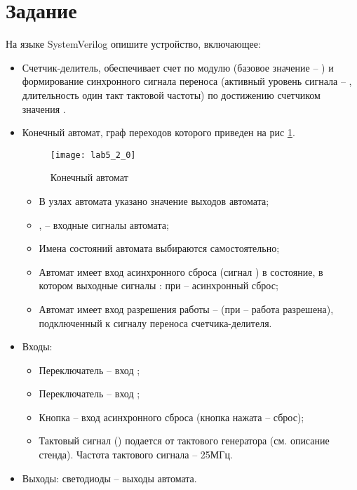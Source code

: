 





\tableofcontents
\listoffigures
\lstlistoflistings
\newpage

\section{Задание}

На языке SystemVerilog опишите устройство, включающее:
\begin{itemize}
	\item Счетчик-делитель, обеспечивает счет по модулю  (базовое значение -- ) и формирование синхронного сигнала переноса (активный уровень сигнала -- , длительность один такт тактовой частоты) по достижению счетчиком значения .
	\item Конечный автомат, граф переходов которого приведен на рис \ref{fig:lab5_2_0}.
		\vspace{-0.5cm}
		\begin{figure}[H]
		\begin{center}
			\texttt{[image: lab5\_2\_0]}
			\caption{Конечный автомат}
			\label{fig:lab5_2_0}
		\end{center}
		\end{figure}
		\vspace{-1cm}
		\begin{itemize}
			\item В узлах автомата указано значение выходов автомата;
			\item {},  – входные сигналы автомата;
			\item Имена состояний автомата выбираются самостоятельно;
			\item Автомат имеет вход асинхронного сброса (сигнал ) в состояние, в котором выходные сигналы : при  – асинхронный сброс;
			\item Автомат имеет вход разрешения работы --  (при  – работа разрешена), подключенный к сигналу переноса счетчика-делителя.
		\end{itemize}	
	\item Входы:
		\begin{itemize}
			\item Переключатель  -- вход ;
			\item Переключатель  – вход ;
			\item Кнопка  – вход асинхронного сброса (кнопка нажата -- сброс);
			\item Тактовый сигнал () подается от тактового генератора (см. описание стенда). Частота тактового сигнала – 25МГц.
		\end{itemize}		
	\item Выходы: светодиоды  -- выходы автомата.
\end{itemize}

